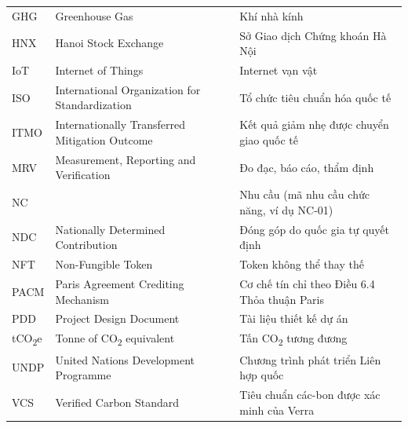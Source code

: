 \documentclass[a4paper,oneside]{report}
\begin{document}
\begin{longtable}{@{}p{2.4cm}p{5.4cm}p{6.3cm}@{}}
GHG    & Greenhouse Gas                            & Khí nhà kính \\
HNX    & Hanoi Stock Exchange                      & Sở Giao dịch Chứng khoán Hà Nội \\
IoT    & Internet of Things                        & Internet vạn vật \\
ISO    & International Organization for Standardization & Tổ chức tiêu chuẩn hóa quốc tế \\
ITMO   & Internationally Transferred Mitigation Outcome & Kết quả giảm nhẹ được chuyển giao quốc tế \\
MRV    & Measurement, Reporting and Verification   & Đo đạc, báo cáo, thẩm định \\
NC     &                                           & Nhu cầu (mã nhu cầu chức năng, ví dụ NC-01) \\
NDC    & Nationally Determined Contribution        & Đóng góp do quốc gia tự quyết định \\
NFT    & Non-Fungible Token                        & Token không thể thay thế \\
PACM   & Paris Agreement Crediting Mechanism       & Cơ chế tín chỉ theo Điều 6.4 Thỏa thuận Paris \\
PDD    & Project Design Document                   & Tài liệu thiết kế dự án \\
tCO\textsubscript{2}e & Tonne of CO\textsubscript{2} equivalent & Tấn CO\textsubscript{2} tương đương \\
UNDP   & United Nations Development Programme      & Chương trình phát triển Liên hợp quốc \\
VCS    & Verified Carbon Standard                  & Tiêu chuẩn các-bon được xác minh của Verra \\

\end{longtable}
\end{document}
